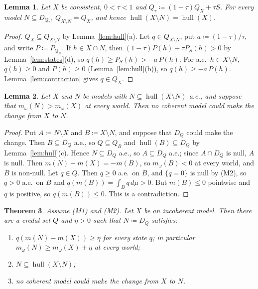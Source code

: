 \documentclass[11pt]{article}
\newcommand{\hull}{\operatorname{hull}}
\theoremstyle{plain}
\newtheorem{theorem}{Theorem}[section]
\newtheorem{lemma}[theorem]{Lemma}
\theoremstyle{definition}
\theoremstyle{remark}
\begin{document}
\begin{lemma}\label{lem:trim}
Let $X$ be consistent, $0<\tau<1$ and $Q_\tau\coloneqq(1-\tau)Q_X+\tau S$. For every model
$N\subseteq D_{Q_\tau}$, $Q_{X\setminus N}=Q_X$, and hence $\hull(X\setminus N)=\hull(X)$.
\end{lemma}

\begin{proof}
$Q_X\subseteq Q_{X\setminus N}$ by Lemma~\ref{lem:hull}(a). Let $q\in Q_{X\setminus N}$, put
$a\coloneqq(1-\tau)/\tau$, and write $P\coloneqq P_{Q_X}$. If $h\in X\cap N$, then $(1-\tau)
P(h)+\tau P_S(h)>0$ by Lemma~\ref{lem:states}(d), so $q(h)\ge P_S(h)>-a\,P(h)$. For a.e.\ $h\in
X\setminus N$, $q(h)\ge0$ and $P(h)\ge0$ (Lemma~\ref{lem:hull}(b)), so $q(h)\ge-a\,P(h)$.
Lemma~\ref{lem:contraction} gives $q\in Q_X$.
\end{proof}

\begin{lemma}\label{lem:change}
Let $X$ and $N$ be models with $N\subseteq\hull(X\setminus N)$ a.e., and suppose that
$m_\omega(N)>m_\omega(X)$ at every world. Then no coherent model could make the change from $X$
to $N$.
\end{lemma}

\begin{proof}
Put $A\coloneqq N\setminus X$ and $B\coloneqq X\setminus N$, and suppose that $D_Q$ could make
the change. Then $B\subseteq D_Q$ a.e., so $Q\subseteq Q_B$ and $\hull(B)\subseteq D_Q$ by
Lemma~\ref{lem:hull}(c). Hence $N\subseteq D_Q$ a.e., so $A\subseteq D_Q$ a.e.; since $A\cap
D_Q$ is null, $A$ is null. Then $m(N)-m(X)=-m(B)$, so $m_\omega(B)<0$ at every world, and $B$
is non-null. Let $q\in Q$. Then $q\ge0$ a.e.\ on $B$, and $\{q=0\}$ is null by (M2), so $q>0$
a.e.\ on $B$ and $q(m(B))=\int_Bq\,d\mu>0$. But $m(B)\le0$ pointwise and $q$ is positive, so
$q(m(B))\le0$. This is a contradiction.
\end{proof}

\begin{theorem}\label{thm:repair}
Assume (M1) and (M2). Let $X$ be an incoherent model. Then there are a credal set $Q$ and $\eta>0$ such that
$N\coloneqq D_Q$ satisfies:
\begin{enumerate}[label=(\arabic*)]
  \item $q(m(N)-m(X))\ge\eta$ for every state $q$; in particular $m_\omega(N)\ge
  m_\omega(X)+\eta$ at every world;
  \item $N\subseteq\hull(X\setminus N)$;
  \item no coherent model could make the change from $X$ to $N$.
\end{enumerate}
\end{theorem}
\end{document}
